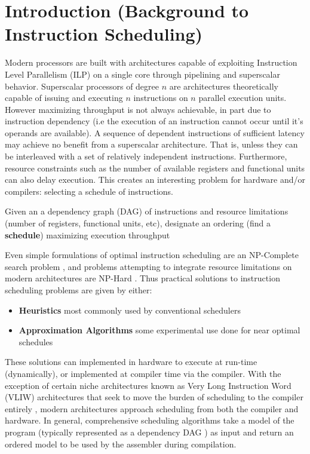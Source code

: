 \documentclass[12pt]{report}
\begin{document}
\newpage
\thispagestyle{empty}
\tableofcontents
\newpage

\chapter{Introduction (Background to Instruction Scheduling)}
\label{sec:org064a0bb}
Modern processors are built with architectures capable of exploiting
Instruction Level Parallelism (ILP) on a single core 
through pipelining and superscalar behavior. Superscalar
processors of degree \(n\) are architectures theoretically capable of issuing
and executing \(n\) instructions on \(n\) parallel execution units. However
maximizing throughput is not always achievable, in part due to instruction
dependency (i.e the execution of an instruction cannot occur until it's
operands are available). A sequence of dependent instructions of sufficient
latency may achieve no benefit from a superscalar architecture. That is, unless they can be
interleaved with a set of relatively independent instructions. Furthermore,
resource constraints such as the number of available registers and functional
units can also delay execution. This creates an interesting problem for
hardware and/or compilers: selecting a schedule of instructions.
\begin{tcolorbox}[title=Problem: Instruction Scheduling]
Given an a dependency graph (DAG) of instructions and resource limitations
(number of registers, functional units, etc), designate an ordering (find a \textbf{schedule}) 
maximizing execution throughput 
\end{tcolorbox}

Even simple formulations of optimal instruction scheduling are an NP-Complete
search problem \parencite{hennessy1983postpass}, and problems attempting to
integrate resource limitations on modern architectures are NP-Hard
\parencite{motwani1995combining}. Thus practical solutions to instruction
scheduling problems are given by either:
\begin{itemize}
\item \textbf{Heuristics} most commonly used by conventional schedulers
\item \textbf{Approximation Algorithms} some experimental use done for near optimal
schedules \parencite{costa2016approx}
\end{itemize}
These solutions can implemented in hardware to execute at run-time
 (dynamically), or implemented at compiler time via the compiler. With the
 exception of certain niche architectures known as Very Long Instruction Word
 (VLIW) architectures that seek to move the burden of scheduling to the compiler
 entirely \parencite{fisher1983very}, modern architectures approach scheduling
 from both the compiler and hardware. In general, comprehensive scheduling
 algorithms take a model of the program (typically represented as a dependency
 DAG \parencite{gibbons1986efficient}) as input and return an ordered model to
 be used by the assembler during compilation.
\end{document}
